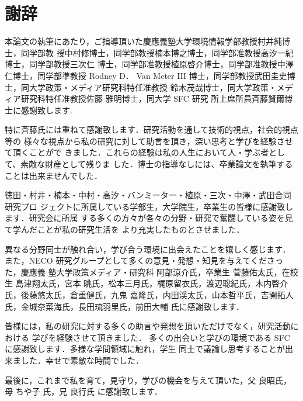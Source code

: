 \chapter*{謝辞}
\label{thanks}

本論文の執筆にあたり，ご指導頂いた慶應義塾大学環境情報学部教授村井純博士，同学部教
授中村修博士，同学部教授楠本博之博士，同学部准教授高汐一紀博士，同学部教授三次仁
博士，同学部准教授植原啓介博士，同学部准教授中澤仁博士，同学部準教授 Rodney D．
Van Meter III 博士，同学部教授武田圭史博士，同大学政策・メディア研究科特任准教授
鈴木茂哉博士，同大学政策・メディア研究科特任准教授佐藤 雅明博士，同大学 SFC 研究
所上席所員斉藤賢爾博士に感謝致します.

特に斉藤氏には重ねて感謝致します．研究活動を通して技術的視点，社会的視点等の
様々な視点から私の研究に対して助言を頂き，深い思考と学びを経験させて頂くことがで
きました．これらの経験は私の人生において人・学ぶ者として、素敵な財産として残りま
した．博士の指導なしには、卒業論文を執筆することは出来ませんでした．

徳田・村井・楠本・中村・高汐・バンミーター・植原・三次・中澤・武田合同研究プロ
ジェクトに所属している学部生，大学院生，卒業生の皆様に感謝致します．研究会に所属
する多くの方々が各々の分野・研究で奮闘している姿を見て学んだことが私の研究生活を
より充実したものとさせました．

異なる分野同士が触れ合い，学び合う環境に出会えたことを嬉しく感じます．
また，NECO 研究グループとして多くの意見・発想・知見を与えてくださった，慶應義
塾大学政策メディア・研究科 阿部涼介氏，卒業生 菅藤佑太氏，在校生 島津翔太氏，宮本
眺氏，松本三月氏，梶原留衣氏，渡辺聡紀氏，木内啓介氏，後藤悠太氏，倉重健氏，九鬼
嘉隆氏，内田渓太氏，山本哲平氏，吉開拓人氏，金城奈菜海氏，長田琉羽里氏，前田大輔
氏に感謝致します．

皆様には，私の研究に対する多くの助言や発想を頂いただけでなく，研究活動における
学びを経験させて頂きました．
多くの出会いと学びの環境である SFC に感謝致します．多様な学問領域に触れ，学生
同士で議論し思考することが出来ました．幸せで素敵な時間でした．

最後に，これまで私を育て，見守り，学びの機会を与えて頂いた，父 良昭氏，母 ちや子
氏，兄 良行氏 に感謝致します．



